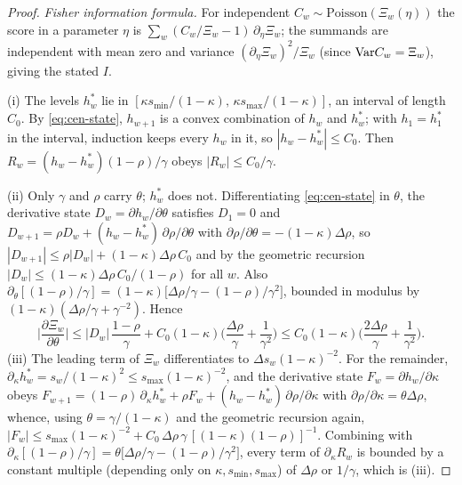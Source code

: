 \begin{proof}
\emph{Fisher information formula.} For independent $C_w \sim \mathrm{Poisson}(\Xi_w(\eta))$ the
score in a parameter $\eta$ is $\sum_w (C_w/\Xi_w - 1)\, \partial_\eta \Xi_w$; the summands are
independent with mean zero and variance $(\partial_\eta \Xi_w)^2/\Xi_w$ (since $\mathrm{Var} C_w = \Xi_w$),
giving the stated $I$.

(i) The levels $h_w^\ast$ lie in $[\kappa s_{\min}/(1-\kappa),\, \kappa s_{\max}/(1-\kappa)]$, an
interval of length $C_0$. By \eqref{eq:cen-state}, $h_{w+1}$ is a convex combination of $h_w$ and
$h_w^\ast$; with $h_1 = h_1^\ast$ in the interval, induction keeps every $h_w$ in it, so $|h_w -
h_w^\ast| \le C_0$. Then $R_w = (h_w - h_w^\ast)(1-\rho)/\gamma$ obeys $|R_w| \le C_0/\gamma$.

(ii) Only $\gamma$ and $\rho$ carry $\theta$; $h_w^\ast$ does not. Differentiating
\eqref{eq:cen-state} in $\theta$, the derivative state $D_w = \partial h_w/\partial\theta$ satisfies
$D_1 = 0$ and $D_{w+1} = \rho D_w + (h_w - h_w^\ast)\, \partial\rho/\partial\theta$ with
$\partial\rho/\partial\theta = -(1-\kappa)\Delta\rho$, so $|D_{w+1}| \le \rho |D_w| +
(1-\kappa)\Delta\rho\, C_0$ and by the geometric recursion $|D_w| \le (1-\kappa)\Delta\rho\,
C_0/(1-\rho)$ for all $w$. Also $\partial_\theta [(1-\rho)/\gamma] =
(1-\kappa)\big[\Delta\rho/\gamma - (1-\rho)/\gamma^2\big]$, bounded in modulus by
$(1-\kappa)(\Delta\rho/\gamma + \gamma^{-2})$. Hence
\[
\Big|\frac{\partial \Xi_w}{\partial\theta}\Big|
\le |D_w|\, \frac{1-\rho}{\gamma} + C_0 (1-\kappa)\Big(\frac{\Delta\rho}{\gamma} +
\frac{1}{\gamma^2}\Big)
\le C_0 (1-\kappa) \Big( \frac{2\Delta\rho}{\gamma} + \frac{1}{\gamma^2} \Big).
\]
(iii) The leading term of $\Xi_w$ differentiates to $\Delta s_w (1-\kappa)^{-2}$. For the remainder,
$\partial_\kappa h_w^\ast = s_w/(1-\kappa)^2 \le s_{\max}(1-\kappa)^{-2}$, and the derivative state
$F_w = \partial h_w/\partial\kappa$ obeys $F_{w+1} = (1-\rho)\, \partial_\kappa h_w^\ast + \rho F_w
+ (h_w - h_w^\ast)\, \partial\rho/\partial\kappa$ with $\partial\rho/\partial\kappa =
\theta\Delta\rho$, whence, using $\theta = \gamma/(1-\kappa)$ and the geometric recursion again,
$|F_w| \le s_{\max}(1-\kappa)^{-2} + C_0\,\Delta\rho\,\gamma\,[(1-\kappa)(1-\rho)]^{-1}$. Combining
with $\partial_\kappa[(1-\rho)/\gamma] = \theta\big[\Delta\rho/\gamma - (1-\rho)/\gamma^2\big]$,
every term of $\partial_\kappa R_w$ is bounded by a constant multiple (depending only on $\kappa,
s_{\min}, s_{\max}$) of $\Delta\rho$ or $1/\gamma$, which is (iii).


\end{proof}
